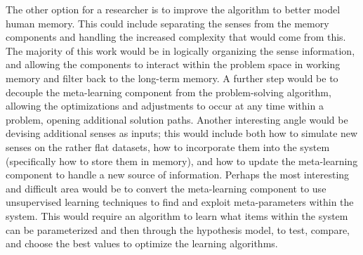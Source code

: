 The other option for a researcher is to improve the algorithm to better model
human memory. This could include separating the senses from the memory
components and handling the increased complexity that would come from this. The
majority of this work would be in logically organizing the sense information,
and allowing the components to interact within the problem space in working
memory and filter back to the long-term memory. A further step would be to
decouple the meta-learning component from the problem-solving algorithm,
allowing the optimizations and adjustments to occur at any time within a
problem, opening additional solution paths.  Another interesting angle would be
devising additional senses as inputs; this would include both how to simulate
new senses on the rather flat datasets, how to incorporate them into the system
(specifically how to store them in memory), and how to update the meta-learning
component to handle a new source of information.  Perhaps the most interesting
and difficult area would be to convert the meta-learning component to use
unsupervised learning techniques to find and exploit meta-parameters within the
system.  This would require an algorithm to learn what items within the system
can be parameterized and then through the hypothesis model, to test, compare,
and choose the best values to optimize the learning algorithms.
